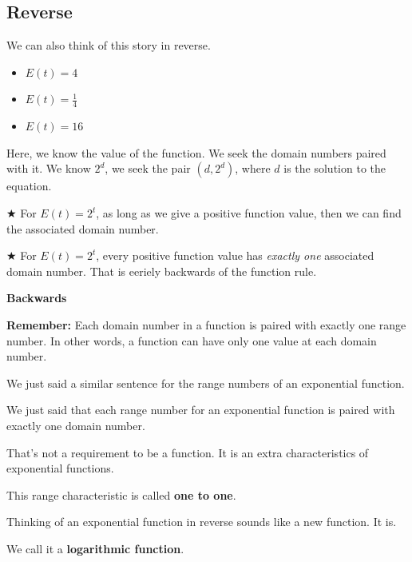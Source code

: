 \documentclass{ximera}
\begin{document}
\subsection*{Reverse}

We can also think of this story in reverse.
\begin{itemize}
\item $E(t) = 4$
\item $E(t) = {\tfrac{1}{4}} $
\item $E(t) = 16 $
\end{itemize}


Here, we know the value of the function.  We seek the domain numbers paired with it. We know $2^d$, we seek the pair $(d, 2^d)$, where $d$ is the solution to the equation.




$\bigstar$ For $E(t) = 2^t$, as long as we give a positive function value, then we can find the associated domain number. 



$\bigstar$ For $E(t) = 2^t$, every positive function value has \textit{exactly one} associated domain number. That is eeriely backwards of the function rule.



\begin{observation}  \textbf{\textcolor{-red!75}{Backwards}}

\textbf{Remember:}  Each domain number in a function is paired with exactly one range number.  In other words, a function can have only one value at each domain number. 


We just said a similar sentence for the range numbers of an exponential function.


We just said that each range number for an exponential function is paired with exactly one domain number.

That's not a requirement to be a function.  It is an extra characteristics of exponential functions. 

This range characteristic is called \textbf{one to one}.



\end{observation}



Thinking of an exponential function in reverse sounds like a new function. It is. 

We call it a \textbf{\textcolor{purple!85!blue}{logarithmic function}}.
\end{document}
